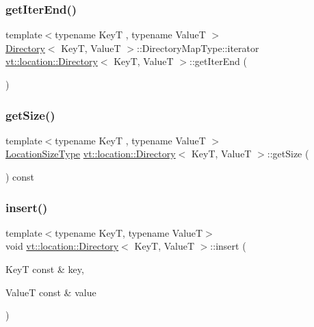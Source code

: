 \mbox{\label{structvt_1_1location_1_1_directory_a7960b610e733ac8df4417a6181e32fe1}} 
\subsubsection{\texorpdfstring{get\+Iter\+End()}{getIterEnd()}}
{\footnotesize\ttfamily template$<$typename KeyT , typename ValueT $>$ \\
\hyperlink{structvt_1_1location_1_1_directory}{Directory}$<$ KeyT, ValueT $>$\+::Directory\+Map\+Type\+::iterator \hyperlink{structvt_1_1location_1_1_directory}{vt\+::location\+::\+Directory}$<$ KeyT, ValueT $>$\+::get\+Iter\+End (\begin{DoxyParamCaption}{ }\end{DoxyParamCaption})}

\mbox{\label{structvt_1_1location_1_1_directory_aa5725f97f3444efc18c8745b747545ac}} 
\subsubsection{\texorpdfstring{get\+Size()}{getSize()}}
{\footnotesize\ttfamily template$<$typename KeyT , typename ValueT $>$ \\
\hyperlink{namespacevt_1_1location_ab1c4c5849012a23eee2fbd1fce6159d7}{Location\+Size\+Type} \hyperlink{structvt_1_1location_1_1_directory}{vt\+::location\+::\+Directory}$<$ KeyT, ValueT $>$\+::get\+Size (\begin{DoxyParamCaption}{ }\end{DoxyParamCaption}) const}

\mbox{\label{structvt_1_1location_1_1_directory_a9c4f1322988eb75cb7abd13d977b315f}} 
\subsubsection{\texorpdfstring{insert()}{insert()}}
{\footnotesize\ttfamily template$<$typename KeyT, typename ValueT$>$ \\
void \hyperlink{structvt_1_1location_1_1_directory}{vt\+::location\+::\+Directory}$<$ KeyT, ValueT $>$\+::insert (\begin{DoxyParamCaption}\item[{KeyT const \&}]{key,  }\item[{ValueT const \&}]{value }\end{DoxyParamCaption})}

